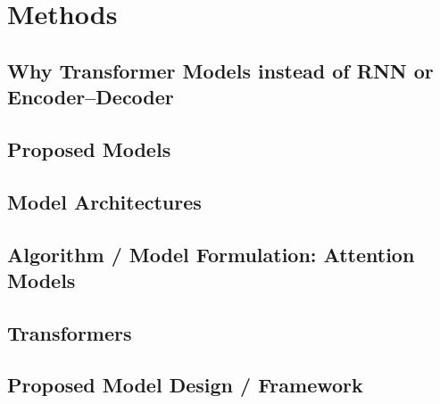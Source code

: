 \section{Methods}
\label{sec:methods}

\subsection{Why Transformer Models instead of RNN or Encoder--Decoder}
\label{sec:why-transformer}

\subsection{Proposed Models}
\label{sec:proposed-models}

\subsection{Model Architectures}
\label{sec:architectures}

\subsection{Algorithm / Model Formulation: Attention Models}
\label{sec:attention}

\subsection{Transformers}
\label{sec:transformers}

\subsection{Proposed Model Design / Framework}
\label{sec:framework}

